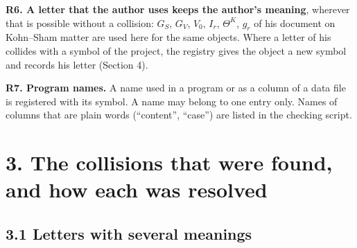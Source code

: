 \documentclass[
  10pt,
]{article}
\begin{document}
\textbf{R6. A letter that the author uses keeps the author's meaning},
wherever that is possible without a collision: \(G_S\), \(G_V\),
\(V_0\), \(I_r\), \(\Theta^K\), \(g_r\) of his document on Kohn--Sham
matter are used here for the same objects. Where a letter of his
collides with a symbol of the project, the registry gives the object a
new symbol and records his letter (Section 4).

\textbf{R7. Program names.} A name used in a program or as a column of a
data file is registered with its symbol. A name may belong to one entry
only. Names of columns that are plain words (``content'', ``case'') are
listed in the checking script.

\hypertarget{the-collisions-that-were-found-and-how-each-was-resolved}{%
\section{3. The collisions that were found, and how each was
resolved}\label{the-collisions-that-were-found-and-how-each-was-resolved}}

\hypertarget{letters-with-several-meanings}{%
\subsection{3.1 Letters with several
meanings}\label{letters-with-several-meanings}}
\end{document}
